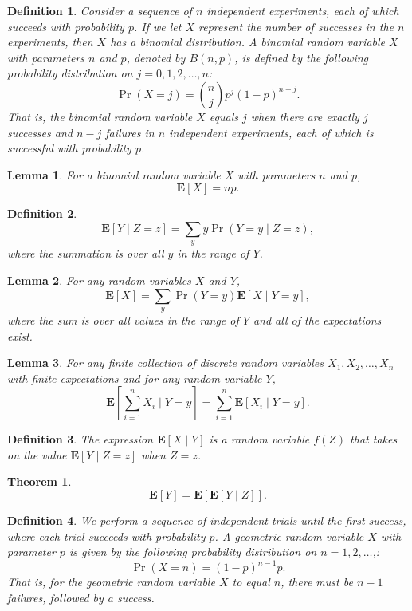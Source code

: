 \documentclass{amsart}
\newtheorem*{definition}{Definition}
\newtheorem*{theorem}{Theorem}
\newtheorem*{lemma}{Lemma}
\newcommand{\E}{\mathbf{E}}
\begin{document}
\begin{definition}
  Consider a sequence of $n$ independent experiments, each of which succeeds
  with probability $p$. If we let $X$ represent the number of successes in the
  $n$ experiments, then $X$ has a binomial distribution. A binomial random
  variable $X$ with parameters $n$ and $p$, denoted by $B(n, p)$, is defined by
  the following probability distribution on $j = 0, 1, 2, \ldots, n$:
  \[
    \Pr(X = j) = \binom{n}{j} p^j {(1 - p)}^{n - j}.
  \]
  That is, the binomial random variable $X$ equals $j$ when there are exactly
  $j$ successes and $n - j$ failures in $n$ independent experiments, each of
  which is successful with probability $p$.
\end{definition}

\begin{lemma}
  For a binomial random variable $X$ with parameters $n$ and $p$,
  \[
    \E[X] = np.
  \]
\end{lemma}

\begin{definition}
  \[
    \E[Y \mid Z = z] = \sum_y y \Pr(Y = y \mid Z = z),
  \]
  where the summation is over all $y$ in the range of $Y$.
\end{definition}

\begin{lemma}
  For any random variables $X$ and $Y$,
  \[
    \E[X] = \sum_y \Pr(Y = y) \E[X \mid Y = y],
  \]
  where the sum is over all values in the range of $Y$ and all of the
  expectations exist.
\end{lemma}

\begin{lemma}
  For any finite collection of discrete random variables $X_1, X_2, \ldots, X_n$
  with finite expectations and for any random variable $Y$,
  \[
    \E \left[ \sum_{i = 1}^n X_i \mid Y = y \right] = \sum_{i = 1}^n \E[X_i \mid
    Y = y].
  \]
\end{lemma}

\begin{definition}
  The expression $\E[X \mid Y]$ is a random variable $f(Z)$ that takes on the
  value $\E[Y \mid Z = z]$ when $Z = z$.
\end{definition}

\begin{theorem}
  \[
    \E[Y] = \E[\E[Y \mid Z]].
  \]
\end{theorem}

\begin{definition}
  We perform a sequence of independent trials until the first success, where
  each trial succeeds with probability $p$. A geometric random variable $X$ with
  parameter $p$ is given by the following probability distribution on $n = 1, 2,
  \ldots$,:
  \[
    \Pr(X = n) = {(1 - p)}^{n - 1} p.
  \]
  That is, for the geometric random variable $X$ to equal $n$, there must be $n
  - 1$ failures, followed by a success.
\end{definition}
\end{document}
